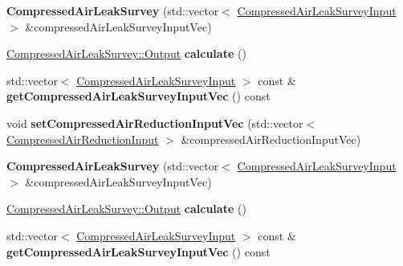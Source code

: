 \begin{DoxyCompactItemize}
\item 
\mbox{\label{class_compressed_air_leak_survey_a29441242636eee3c8a857068153555be}} 
{\bfseries Compressed\+Air\+Leak\+Survey} (std\+::vector$<$ \hyperlink{class_compressed_air_leak_survey_input}{Compressed\+Air\+Leak\+Survey\+Input} $>$ \&compressed\+Air\+Leak\+Survey\+Input\+Vec)
\item 
\mbox{\label{class_compressed_air_leak_survey_a2115dcf2507ac17779f3e1e885e39263}} 
\hyperlink{struct_compressed_air_leak_survey_1_1_output}{Compressed\+Air\+Leak\+Survey\+::\+Output} {\bfseries calculate} ()
\item 
\mbox{\label{class_compressed_air_leak_survey_aa827f5971308799b61dad6390d561bd7}} 
std\+::vector$<$ \hyperlink{class_compressed_air_leak_survey_input}{Compressed\+Air\+Leak\+Survey\+Input} $>$ const  \& {\bfseries get\+Compressed\+Air\+Leak\+Survey\+Input\+Vec} () const
\item 
\mbox{\label{class_compressed_air_leak_survey_a97fa87b2e5ac20e9c29ce5df271240db}} 
void {\bfseries set\+Compressed\+Air\+Reduction\+Input\+Vec} (std\+::vector$<$ \hyperlink{class_compressed_air_reduction_input}{Compressed\+Air\+Reduction\+Input} $>$ \&compressed\+Air\+Reduction\+Input\+Vec)
\item 
\mbox{\label{class_compressed_air_leak_survey_a29441242636eee3c8a857068153555be}} 
{\bfseries Compressed\+Air\+Leak\+Survey} (std\+::vector$<$ \hyperlink{class_compressed_air_leak_survey_input}{Compressed\+Air\+Leak\+Survey\+Input} $>$ \&compressed\+Air\+Leak\+Survey\+Input\+Vec)
\item 
\mbox{\label{class_compressed_air_leak_survey_a2115dcf2507ac17779f3e1e885e39263}} 
\hyperlink{struct_compressed_air_leak_survey_1_1_output}{Compressed\+Air\+Leak\+Survey\+::\+Output} {\bfseries calculate} ()
\item 
\mbox{\label{class_compressed_air_leak_survey_aa827f5971308799b61dad6390d561bd7}} 
std\+::vector$<$ \hyperlink{class_compressed_air_leak_survey_input}{Compressed\+Air\+Leak\+Survey\+Input} $>$ const  \& {\bfseries get\+Compressed\+Air\+Leak\+Survey\+Input\+Vec} () const

\end{DoxyCompactItemize}
